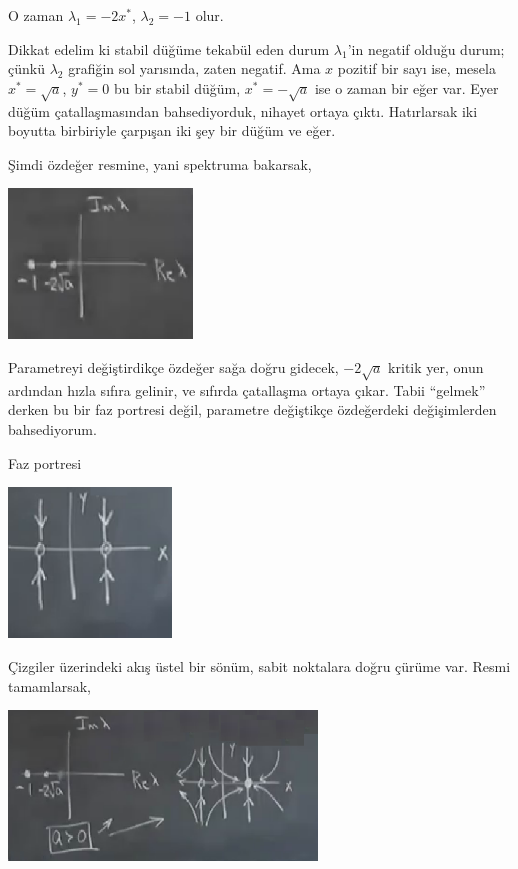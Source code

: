 \documentclass[12pt,fleqn]{article}\usepackage{../../common}
\begin{document}
O zaman $\lambda_1 = -2x^\ast$, $\lambda_2 = -1$ olur.

Dikkat edelim ki stabil düğüme tekabül eden durum $\lambda_1$'in negatif olduğu
durum; çünkü $\lambda_2$ grafiğin sol yarısında, zaten negatif. Ama $x$ pozitif
bir sayı ise, mesela $x^\ast = \sqrt{a}$, $y^\ast=0$ bu bir stabil düğüm, $x^\ast =
-\sqrt{a}$ ise o zaman bir eğer var. Eyer düğüm çatallaşmasından bahsediyorduk,
nihayet ortaya çıktı. Hatırlarsak iki boyutta birbiriyle çarpışan iki şey bir
düğüm ve eğer.

Şimdi özdeğer resmine, yani spektruma bakarsak, 

\includegraphics[height=4cm]{12_11.png}

Parametreyi değiştirdikçe özdeğer sağa doğru gidecek, $-2\sqrt{a}$ kritik yer,
onun ardından hızla sıfıra gelinir, ve sıfırda çatallaşma ortaya çıkar. Tabii
``gelmek'' derken bu bir faz portresi değil, parametre değiştikçe özdeğerdeki
değişimlerden bahsediyorum.

Faz portresi

\includegraphics[height=4cm]{12_12.png}

Çizgiler üzerindeki akış üstel bir sönüm, sabit noktalara doğru çürüme
var. Resmi tamamlarsak,

\includegraphics[height=4cm]{12_13.png}
\end{document}
